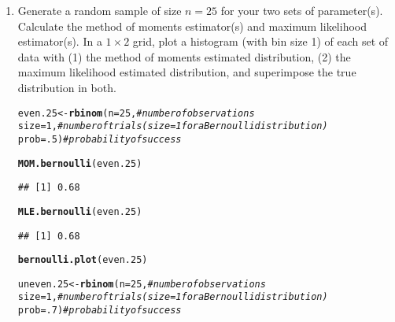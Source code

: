 \documentclass{article}\usepackage[]{graphicx}\usepackage[]{color}
\makeatletter
\newcommand{\hlnum}[1]{\textcolor[rgb]{0.686,0.059,0.569}{#1}}%
\newcommand{\hlcom}[1]{\textcolor[rgb]{0.678,0.584,0.686}{\textit{#1}}}%
\newcommand{\hlstd}[1]{\textcolor[rgb]{0.345,0.345,0.345}{#1}}%
\newcommand{\hlkwb}[1]{\textcolor[rgb]{0.69,0.353,0.396}{#1}}%
\newcommand{\hlkwc}[1]{\textcolor[rgb]{0.333,0.667,0.333}{#1}}%
\newcommand{\hlkwd}[1]{\textcolor[rgb]{0.737,0.353,0.396}{\textbf{#1}}}%
\newenvironment{kframe}{%
 \def\at@end@of@kframe{}%
 \ifinner\ifhmode%
  \def\at@end@of@kframe{\end{minipage}}%
  \begin{minipage}{\columnwidth}%
 \fi\fi%
 \def\FrameCommand##1{\hskip\@totalleftmargin \hskip-\fboxsep
 \colorbox{shadecolor}{##1}\hskip-\fboxsep
     \hskip-\linewidth \hskip-\@totalleftmargin \hskip\columnwidth}%
 \MakeFramed {\advance\hsize-\width
   \@totalleftmargin\z@ \linewidth\hsize
   \@setminipage}}%
 {\par\unskip\endMakeFramed%
 \at@end@of@kframe}
\newenvironment{knitrout}{}{} %
\makeatother
\begin{document}
\begin{enumerate}
\begin{enumerate}
\begin{knitrout}
\begin{kframe}
{\ttfamily\noindent\bfseries\color{errorcolor}{\#\# Error: Can't add `p2` to a ggplot object.}}\end{kframe}
\end{knitrout}
  \item Generate a random sample of size $n=25$ for your two sets of parameter(s). 
  Calculate the method of moments estimator(s) and maximum likelihood estimator(s).
  In a $1 \times 2$ grid, plot a histogram (with bin size 1) of each set of data 
  with (1) the method of moments estimated distribution, (2) the maximum likelihood 
  estimated distribution, and superimpose the true distribution in both.
\begin{knitrout}
\color{fgcolor}\begin{kframe}
\begin{alltt}
\hlstd{even.25} \hlkwb{<-} \hlkwd{rbinom}\hlstd{(}\hlkwc{n}\hlstd{=}\hlnum{25}\hlstd{,}        \hlcom{#number of observations}
                  \hlkwc{size}\hlstd{=}\hlnum{1}\hlstd{,}        \hlcom{#number of trials (size=1 for a Bernoulli distribution)}
                  \hlkwc{prob}\hlstd{=}\hlnum{.5}\hlstd{)}       \hlcom{#probability of success}

\hlkwd{MOM.bernoulli}\hlstd{(even.25)}
\end{alltt}
\begin{verbatim}
## [1] 0.68
\end{verbatim}
\begin{alltt}
\hlkwd{MLE.bernoulli}\hlstd{(even.25)}
\end{alltt}
\begin{verbatim}
## [1] 0.68
\end{verbatim}
\begin{alltt}
\hlkwd{bernoulli.plot}\hlstd{(even.25)}
\end{alltt}


{\ttfamily\noindent\bfseries\color{errorcolor}{\#\# Error: Can't add `p2` to a ggplot object.}}\begin{alltt}
\hlstd{uneven.25} \hlkwb{<-} \hlkwd{rbinom}\hlstd{(}\hlkwc{n}\hlstd{=}\hlnum{25}\hlstd{,}        \hlcom{#number of observations}
                    \hlkwc{size}\hlstd{=}\hlnum{1}\hlstd{,}        \hlcom{#number of trials (size=1 for a Bernoulli distribution)}
                    \hlkwc{prob}\hlstd{=}\hlnum{.7}\hlstd{)}       \hlcom{#probability of success}


\end{alltt}
\end{kframe}
\end{knitrout}
\end{enumerate}
\end{enumerate}
\end{document}
